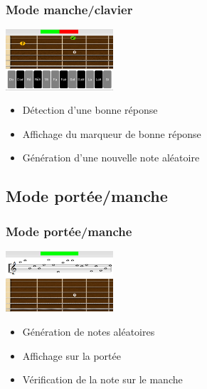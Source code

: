 \documentclass{beamer}
\begin{document}
		\begin{frame}
			\frametitle{Mode manche/clavier}


			\begin{minipage}{0.35\linewidth}
				\includegraphics[width=4cm]{images/presentation_mc_good.png}
			\end{minipage}\hfill
			\begin{minipage}{0.6\linewidth}
				
				\begin{itemize}
					\item Détection d'une bonne réponse
					\item Affichage du marqueur de bonne réponse
					\item Génération d'une nouvelle note aléatoire
				\end{itemize}
			\end{minipage}
			\bigbreak

		\end{frame}	

	\subsection{Mode portée/manche}
		\begin{frame}
			\frametitle{Mode portée/manche}

			\begin{minipage}{0.35\linewidth}
				\includegraphics[width=4cm]{images/presentation_pm.png}
			\end{minipage}\hfill
			\begin{minipage}{0.6\linewidth}
				
				\begin{itemize}
					\item Génération de notes aléatoires
					\item Affichage sur la portée 
					\item Vérification de la note sur le manche
				\end{itemize}
			\end{minipage}
			
		\end{frame}	
\end{document}
